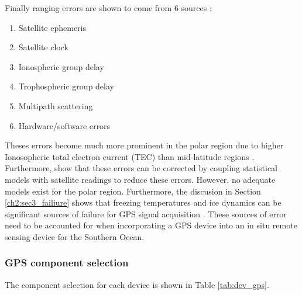 Finally ranging errors are shown to come from 6 sources \cite{spilker1996global}:
\begin{enumerate}
	\item Satellite ephemeris
	\item Satellite clock
	\item Ionospheric group delay
	\item Trophospheric group delay
	\item Multipath scattering
	\item Hardware/software errors
\end{enumerate}

Theses errors become much more prominent in the polar region due to higher Ionosopheric total electron current (TEC) than mid-latitude regions \cite{bishop1990ranging}. Furthermore, \textcite{bishop1990ranging} show that these errors can be corrected by coupling statistical models with satellite readings to reduce these errors. However, no adequate models exist for the polar region. Furthermore, the discusion in Section \ref{ch2:sec3_failiure} shows that freezing temperatures and ice dynamics can be significant sources of failure for GPS signal acquisition \cite{doble2017robust}. These sources of error need to be accounted for when incorporating a GPS device into an in situ remote sensing device for the Southern Ocean.
\subsubsection{GPS component selection}

The component selection for each device is shown in Table \ref{tab:dev_gps}.

